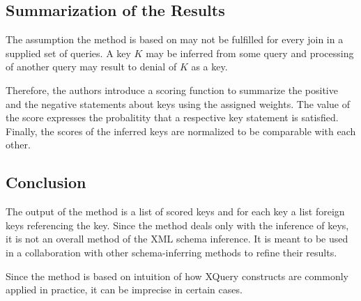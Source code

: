 \subsection{Summarization of the Results}

The assumption the method is based on may not be fulfilled for every join in a supplied set of queries. A key $K$ may be inferred from some query and processing of another query may result to denial of $K$ as a key. 

Therefore, the authors introduce a scoring function to summarize the positive and the negative statements about keys using the assigned weights. The value of the score expresses the probalitity that a respective key statement is satisfied. Finally, the scores of the inferred keys are normalized to be comparable with each other.

\subsection{Conclusion}
The output of the method is a list of scored keys and for each key a list foreign keys referencing the key. Since the method deals only with the inference of keys, it is not an overall method of the XML schema inference. It is meant to be used in a collaboration with other schema-inferring methods to refine their results.

Since the method is based on intuition of how XQuery constructs are commonly applied in practice, it can be imprecise in certain cases.


